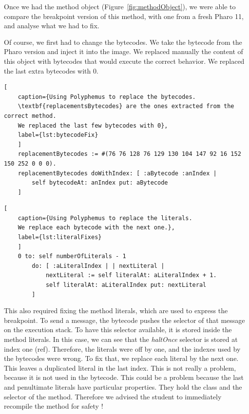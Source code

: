 \documentclass{article}
\begin{document}
Once we had the method object (Figure~\ref{fig:methodObject}), we were able to compare the breakpoint version of this method, with one from a fresh Pharo 11, and analyse what we had to fix.

Of course, we first had to change the bytecodes.
We take the bytecode from the Pharo version and inject it into the image.
We replaced manually the content of this object with bytecodes that would execute the correct behavior.
We replaced the last extra bytecodes with 0.


\begin{lstlisting}[
    caption={Using Polyphemus to replace the bytecodes.
    \textbf{replacementsBytecodes} are the ones extracted from the correct method.
    We replaced the last few bytecodes with 0},
    label={lst:bytecodeFix}
    ]
    replacementBytecodes := #(76 76 128 76 129 130 104 147 92 16 152 150 252 0 0 0).
    replacementBytecodes doWithIndex: [ :aBytecode :anIndex |
        self bytecodeAt: anIndex put: aBytecode
    ]
\end{lstlisting}



\begin{lstlisting}[
    caption={Using Polyphemus to replace the literals.
    We replace each bytecode with the next one.},
    label={lst:literalFixes}
    ]
    0 to: self numberOfLiterals - 1 
        do: [ :aLiteralIndex | | nextLiteral |
            nextLiteral := self literalAt: aLiteralIndex + 1.
            self literalAt: aLiteralIndex put: nextLiteral
        ]
\end{lstlisting}



This also required fixing the method literals, which are used to express the breakpoint.
To send a message, the bytecode pushes the selector of that message on the execution stack.
To have this selector available, it is stored inside the method literals.
In this case, we can see that the \textit{haltOnce} selector is stored at index one (ref).
Therefore, the literals were off by one, and the indexes used by the bytecodes were wrong.
To fix that, we replace each literal by the next one.
This leaves a duplicated literal in the last index.
This is not really a problem, because it is not used in the bytecode.
This could be a problem because the last and penultimate literals have particular properties.
They hold the class and the selector of the method.
Therefore we advised the student to immediately recompile the method for safety !
\end{document}
